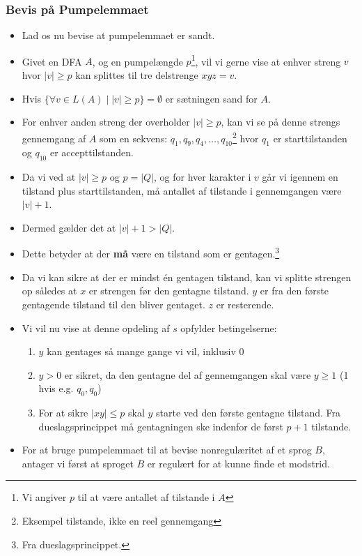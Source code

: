 \begin{frame}[allowframebreaks]
	\frametitle{Bevis på Pumpelemmaet}
	\begin{itemize}
		\item Lad os nu bevise at pumpelemmaet er sandt.
	  \item Givet en DFA $A$, og en pumpelængde $p$\footnote{Vi angiver $p$ til at være antallet af tilstande i $A$}, vil vi gerne vise at enhver streng $v$ hvor $|v| \ge p$ kan splittes til tre delstrenge $xyz = v$.
	  \item Hvis $\{\forall v \in L(A)  \mid |v| \ge p\} = \emptyset$ er sætningen sand for $A$.
	  \item For enhver anden streng der overholder $|v| \ge p$, kan vi se på denne strengs gennemgang af $A$ som en sekvens: $q_{1}, q_{9}, q_{4}, \ldots, q_{10}$\footnote{Eksempel tilstande, ikke en reel gennemgang} hvor $q_{1}$ er starttilstanden og $q_{10}$ er accepttilstanden.
	  \item Da vi ved at $|v| \ge p$ og $p = |Q|$, og for hver karakter i $v$ går vi igennem en tilstand plus starttilstanden, må antallet af tilstande i gennemgangen være $|v| + 1$.
	  \item Dermed gælder det at $|v| + 1 > |Q|$.
	  \item Dette betyder at der \textbf{må} være en tilstand som er gentagen.\footnote{Fra dueslagsprincippet.}
	  \item Da vi kan sikre at der er mindst én gentagen tilstand, kan vi splitte strengen op således at $x$ er strengen før den gentagne tilstand. $y$ er fra den første gentagende tilstand til den bliver gentaget. $z$ er resterende.
	  \item Vi vil nu vise at denne opdeling af $s$ opfylder betingelserne:
			\begin{enumerate}
			  \item $y$ kan gentages så mange gange vi vil, inklusiv $0$
			  \item $y > 0$ er sikret, da den gentagne del af gennemgangen skal være $y \ge 1$ (1 hvis e.g. $q_{0}, q_{0}$)
			  \item For at sikre $|xy| \le p$ skal $y$ starte ved den første gentagne tilstand. Fra dueslagsprincippet må gentagningen ske indenfor de først $p+1$ tilstande.
 			\end{enumerate}
	  \item For at bruge pumpelemmaet til at bevise nonregulæritet af et sprog $B$, antager vi først at sproget $B$ er regulært for at kunne finde et modstrid.
	\end{itemize}
\end{frame}

